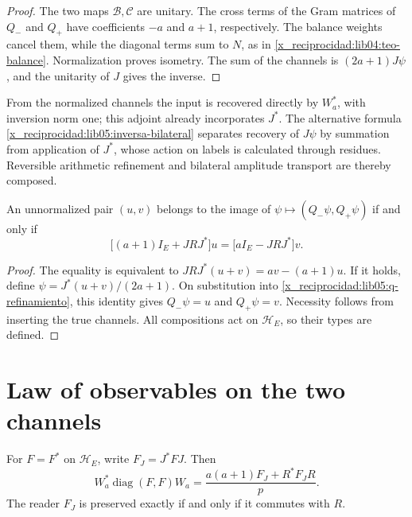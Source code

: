 \begin{proof}
The two maps \(\mathcal B,\mathcal C\) are unitary.
The cross terms of the Gram matrices of \(Q_-\) and \(Q_+\) have
coefficients \(-a\) and \(a+1\), respectively. The balance
weights cancel them, while the diagonal terms sum to
\(N\), as in \cref{x_reciprocidad:lib04:teo-balance}. Normalization
proves isometry. The sum of the channels is
\((2a+1)J\psi\), and the unitarity of \(J\) gives the inverse.
\end{proof}

From the normalized channels the input is recovered directly
by \(W_a^*\), with inversion norm one; this adjoint already incorporates
\(J^*\). The alternative formula
\eqref{x_reciprocidad:lib05:inversa-bilateral} separates recovery of \(J\psi\)
by summation from application of \(J^*\), whose action on labels
is calculated through residues. Reversible arithmetic refinement
and bilateral amplitude transport are thereby composed.

\begin{proposition}
\label{x_reciprocidad:lib05:prop-compatibilidad}
An unnormalized pair \((u,v)\) belongs to the image of
\(\psi\mapsto(Q_-\psi,Q_+\psi)\) if and only if
\begin{equation}
 \bigl[(a+1)I_E+JRJ^*\bigr]u
 =\bigl[aI_E-JRJ^*\bigr]v.
 \label{x_reciprocidad:lib05:compatibilidad}
\end{equation}
\end{proposition}

\begin{proof}
The equality is equivalent to
\(JRJ^*(u+v)=av-(a+1)u\). If it holds, define
\(\psi=J^*(u+v)/(2a+1)\). On substitution into
\eqref{x_reciprocidad:lib05:q-refinamiento}, this identity gives
\(Q_-\psi=u\) and \(Q_+\psi=v\). Necessity follows from
inserting the true channels. All compositions act
on \(\mathscr H_E\), so their types are defined.
\end{proof}

\section{Law of observables on the two channels}
\label{x_reciprocidad:lib05:ley-lectores}

\begin{theorem}
\label{x_reciprocidad:lib05:teo-lector}
For \(F=F^*\) on \(\mathscr H_E\), write
\(F_J=J^*FJ\). Then
\begin{equation}
 W_a^*\operatorname{diag}(F,F)W_a
 =\frac{a(a+1)F_J+R^*F_JR}{p}.
 \label{x_reciprocidad:lib05:lector-bilateral}
\end{equation}
The reader \(F_J\) is preserved exactly if and only if it commutes
with \(R\).
\end{theorem}

